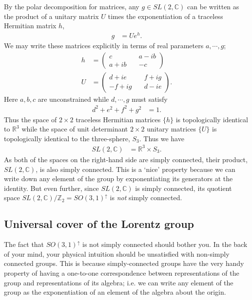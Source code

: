 \documentclass[12pt]{article}
\numberwithin{equation}{section}    %
\begin{document}
By the polar decomposition for matrices, any $g \in SL(2,\mathbb C)$ can be written as the product of a unitary matrix $U$ times the exponentiation of a traceless Hermitian matrix $h$,
\begin{align}
	g &= U e^{h}.
\end{align}
We may write these matrices explicitly in terms of real parameters $a,\cdots,g$;
\begin{align}
	 h &= \begin{pmatrix}c \quad& a-ib\\ a+ib \quad& -c\end{pmatrix}\\
	 U &= \begin{pmatrix}d+ie \quad& f+ig\\-f+ig \quad& d-ie\end{pmatrix}.
\end{align}
Here $a,b,c$ are unconstrained while $d,\cdots,g$ must satisfy
\begin{align}
	d^2+e^2+f^2+g^2 &= 1.
\end{align}
Thus the space of $2\times 2$ traceless Hermitian matrices $\{h\}$ is topologically identical to $\mathbb R^3$ while the space of unit determinant $2\times 2$ unitary matrices $\{U\}$ is topologically identical to the three-sphere, $S_3$. Thus we have
\begin{align}
	SL(2,\mathbb C) &= \mathbb R^3 \times S_3.
\end{align}
As both of the spaces on the right-hand side are simply connected, their product, $SL(2,\mathbb C)$, is also simply connected. This is a `nice' property because we can write down any element of the group by exponentiating its generators at the identity. But even further, since $SL(2,\mathbb C)$ is simply connected, its quotient space $SL(2,\mathbb C)/\mathbb Z_2 = SO(3,1)^\uparrow$ is \emph{not} simply connected.

\subsection{Universal cover of the Lorentz group}\label{sec:SUSYalg:universal:cover}

The fact that $SO(3,1)^\uparrow$ is not simply connected should bother you. In the back of your mind, your physical intuition should be unsatisfied with non-simply connected groups. This is because simply-connected groups have the very handy property of having a one-to-one correspondence between representations of the group and representations of its algebra; i.e. we can write any element of the group as the exponentiation of an element of the algebra about the origin. 
\end{document}

